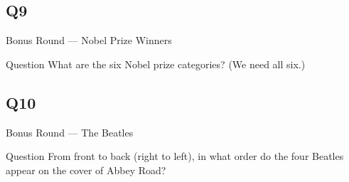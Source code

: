 \documentclass[11pt]{beamer}
\begin{document}
\subsection*{Q9}
\begin{frame}[t]{Bonus Round --- Nobel Prize Winners}
\vspace{-0.5em}
\begin{block}{Question}
What are the six Nobel prize categories? (We need all six.)
\end{block}
\end{frame}
\subsection*{Q10}
\begin{frame}[t]{Bonus Round --- The Beatles}
\vspace{-0.5em}
\begin{block}{Question}
From front to back (right to left), in what order do the four Beatles appear on the cover of Abbey Road?
\end{block}
\end{frame}
\end{document}
